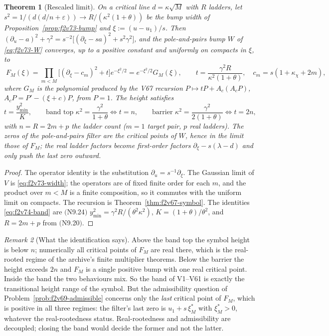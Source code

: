 \documentclass[11pt]{article}
\newtheorem{theorem}{Theorem}[section]
\theoremstyle{definition}
\theoremstyle{remark}
\newtheorem{remark}[theorem]{Remark}
\begin{document}
\begin{theorem}[Rescaled limit]
\label{thm:f2v74-limit}
On a critical line \(d=\kappa\sqrt M\) with \(R\) ladders, let
\(s^2=1/(d(d/n+\varepsilon))\to R/(\kappa^2(1+\theta))\) be the bump width
of Proposition~\ref{prop:f2v73-bump} and \(\xi:=(u-u_1)/s\).  Then
\((\partial_u-a)^2+\gamma^2=s^{-2}\bigl[(\partial_\xi-sa)^2+s^2\gamma^2\bigr]\),
and the pole-and-pairs bump \(W\) of \eqref{eq:f2v73-W} converges, up to
a positive constant and uniformly on compacts in \(\xi\), to
\begin{equation}
 \boxed{\;F_M(\xi)=\prod_{m<M}\bigl[(\partial_\xi-c_m)^2+t\bigr]e^{-\xi^2/2}
 =e^{-\xi^2/2}G_M(\xi),\qquad
 t=\frac{\gamma^2R}{\kappa^2(1+\theta)},\quad c_m=s(1+\kappa_\chi+2m),}
 \label{eq:f2v74-F}
\end{equation}
where \(G_M\) is the polynomial produced by the V67 recursion
\(P\mapsto tP+A_c(A_cP)\), \(A_cP=P'-(\xi+c)P\), from \(P=1\).  The
height satisfies
\begin{equation}
 t=\frac{y_{\min}^2}{K},\qquad
 \text{band top }\kappa^2=\frac{\gamma^2}{1+\theta}\iff t=n,\qquad
 \text{barrier }\kappa^2=\frac{\gamma^2}{2(1+\theta)}\iff t=2n,
 \label{eq:f2v74-band}
\end{equation}
with \(n=R=2m+p\) the ladder count (\(m=1\) target pair, \(p\) real
ladders).  The zeros of the pole-and-pairs filter are the critical points
of \(W\), hence in the limit those of \(F_M\); the real ladder factors
become first-order factors \(\partial_\xi-s(\lambda-d)\) and only push the
last zero outward.
\end{theorem}

\begin{proof}
The operator identity is the substitution \(\partial_u=s^{-1}\partial_\xi\).
The Gaussian limit of \(V\) is \eqref{eq:f2v73-width}; the operators are
of fixed finite order for each \(m\), and the product over \(m<M\) is a
finite composition, so it commutes with the uniform limit on compacts.
The recursion is Theorem~\ref{thm:f2v67-symbol}.  The identities
\eqref{eq:f2v74-band} are \((\)N9.24\()\) \(y_{\min}^2=\gamma^2R/(\theta^2\kappa^2)\),
\(K=(1+\theta)/\theta^2\), and \(R=2m+p\) from \((\)N9.20\()\).
\end{proof}

\begin{remark}[What the identification says]
\label{rem:f2v74-meaning}
Above the band top the symbol height is below \(n\); numerically all
critical points of \(F_M\) are real there, which is the real-rooted
regime of the archive's finite multiplier theorems.  Below the barrier the
height exceeds \(2n\) and \(F_M\) is a single positive bump with one real
critical point.  Inside the band the two behaviours mix.  So the band of
V1--V61 is exactly the transitional height range of the symbol.  But the
admissibility question of Problem~\ref{prob:f2v69-admissible} concerns
only the \emph{last} critical point of \(F_M\), which is positive in all
three regimes: the filter's last zero is \(u_1+s\,\xi^*_M\) with
\(\xi^*_M>0\), whatever the real-rootedness status.  Real-rootedness and
admissibility are decoupled; closing the band would decide the former
and not the latter.
\end{remark}
\end{document}
